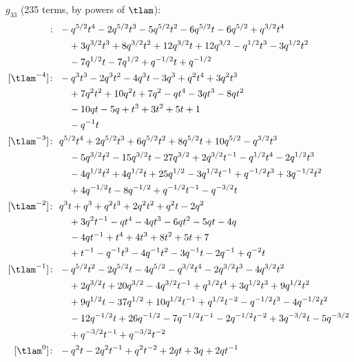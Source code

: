 $g_{33}$ (235 terms, by powers of $\tlam$):
\begin{align*}
[\tlam^{-5}]\colon\ & -q^{5/2} t^{4} -2 q^{5/2} t^{3} -5 q^{5/2} t^{2} -6 q^{5/2} t -6 q^{5/2} +q^{3/2} t^{4} \\
& \quad +3 q^{3/2} t^{3} +8 q^{3/2} t^{2} +12 q^{3/2} t +12 q^{3/2} -q^{1/2} t^{3} -3 q^{1/2} t^{2} \\
& \quad -7 q^{1/2} t -7 q^{1/2} +q^{-1/2} t +q^{-1/2} \\
[\tlam^{-4}]\colon\ & -q^{3} t^{3} -2 q^{3} t^{2} -4 q^{3} t -3 q^{3} +q^{2} t^{4} +3 q^{2} t^{3} \\
& \quad +7 q^{2} t^{2} +10 q^{2} t +7 q^{2} -q t^{4} -3 q t^{3} -8 q t^{2} \\
& \quad -10 q t -5 q +t^{3} +3 t^{2} +5 t +1 \\
& \quad -q^{-1} t \\
[\tlam^{-3}]\colon\ & q^{5/2} t^{4} +2 q^{5/2} t^{3} +6 q^{5/2} t^{2} +8 q^{5/2} t +10 q^{5/2} -q^{3/2} t^{3} \\
& \quad -5 q^{3/2} t^{2} -15 q^{3/2} t -27 q^{3/2} +2 q^{3/2} t^{-1} -q^{1/2} t^{4} -2 q^{1/2} t^{3} \\
& \quad -4 q^{1/2} t^{2} +4 q^{1/2} t +25 q^{1/2} -3 q^{1/2} t^{-1} +q^{-1/2} t^{3} +3 q^{-1/2} t^{2} \\
& \quad +4 q^{-1/2} t -8 q^{-1/2} +q^{-1/2} t^{-1} -q^{-3/2} t \\
[\tlam^{-2}]\colon\ & q^{3} t +q^{3} +q^{2} t^{3} +2 q^{2} t^{2} +q^{2} t -2 q^{2} \\
& \quad +3 q^{2} t^{-1} -q t^{4} -4 q t^{3} -6 q t^{2} -5 q t -4 q \\
& \quad -4 q t^{-1} +t^{4} +4 t^{3} +8 t^{2} +5 t +7 \\
& \quad +t^{-1} -q^{-1} t^{3} -4 q^{-1} t^{2} -3 q^{-1} t -2 q^{-1} +q^{-2} t \\
[\tlam^{-1}]\colon\ & -q^{5/2} t^{2} -2 q^{5/2} t -4 q^{5/2} -q^{3/2} t^{4} -2 q^{3/2} t^{3} -4 q^{3/2} t^{2} \\
& \quad +2 q^{3/2} t +20 q^{3/2} -4 q^{3/2} t^{-1} +q^{1/2} t^{4} +3 q^{1/2} t^{3} +9 q^{1/2} t^{2} \\
& \quad +9 q^{1/2} t -37 q^{1/2} +10 q^{1/2} t^{-1} +q^{1/2} t^{-2} -q^{-1/2} t^{3} -4 q^{-1/2} t^{2} \\
& \quad -12 q^{-1/2} t +26 q^{-1/2} -7 q^{-1/2} t^{-1} -2 q^{-1/2} t^{-2} +3 q^{-3/2} t -5 q^{-3/2} \\
& \quad +q^{-3/2} t^{-1} +q^{-3/2} t^{-2} \\
[\tlam^{0}]\colon\ & -q^{2} t -2 q^{2} t^{-1} +q^{2} t^{-2} +2 q t +3 q +2 q t^{-1} \\

\end{align*}
